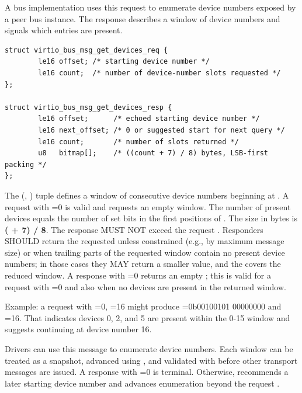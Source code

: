 
A bus implementation uses this request to enumerate device numbers exposed by a
peer bus instance. The response describes a window of device numbers and
signals which entries are present.

\begin{lstlisting}
struct virtio_bus_msg_get_devices_req {
        le16 offset; /* starting device number */
        le16 count;  /* number of device-number slots requested */
};

struct virtio_bus_msg_get_devices_resp {
        le16 offset;      /* echoed starting device number */
        le16 next_offset; /* 0 or suggested start for next query */
        le16 count;       /* number of slots returned */
        u8   bitmap[];    /* ((count + 7) / 8) bytes, LSB-first packing */
};
\end{lstlisting}

The (, ) tuple defines a window of 
consecutive device numbers beginning at . A request with
=0 is valid and requests an empty window. The number of present
devices equals the number of set bits in the first  positions of
. The  size in bytes is
\textbf{( + 7) / 8}. The response  MUST NOT exceed
the request . Responders SHOULD return the requested
 unless constrained
(e.g., by maximum message size) or when trailing parts of the requested window
contain no present device numbers; in those cases they MAY return a smaller
value, and the  covers the reduced window. A response with
=0 returns an empty ; this is valid for a request
with =0 and also when no devices are present in the returned
window.

Example: a request with =0, =16 might produce
=0b00100101 00000000 and =16. That indicates
devices 0, 2, and 5 are present within the 0-15 window and suggests continuing
at device number 16.

Drivers can use this message to enumerate device numbers. Each window can be
treated as a snapshot, advanced using , and validated with
 before other transport messages are issued. A response
with =0 is terminal. Otherwise, 
recommends a later starting device number and advances enumeration beyond the
request .

